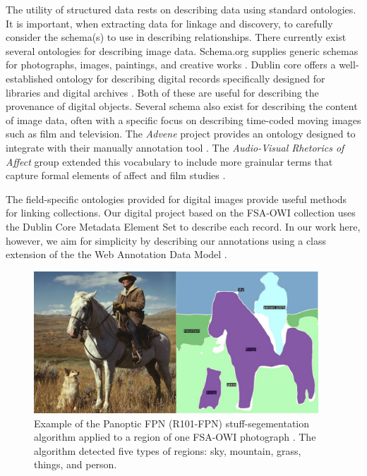 \documentclass[10pt, a4paper]{article}
\begin{document}
The utility of structured data rests on describing data using standard
ontologies. It is important, when extracting data for linkage and discovery,
to carefully consider the schema(s) to use in describing relationships. There
currently exist several ontologies for describing image data. Schema.org
supplies generic schemas for photographs, images, paintings, and creative works
\cite{guha2016schema}. Dublin core offers a well-established ontology for
describing digital records specifically designed for libraries and digital
archives \cite{weibel1997dublin}. Both of these are useful for describing the
provenance of digital objects. Several schema also exist for describing the
content of image data, often with a specific focus on describing time-coded
moving images such as film and television. The \textit{Advene} project provides
an ontology designed to integrate with their manually annotation
tool \cite{aubert2005advene}. The \textit{Audio-Visual Rhetorics of Affect}
group extended this vocabulary to include more grainular terms that capture
formal elements of affect and film studies \cite{agt2018semantic}.

The field-specific ontologies provided for digital images provide useful
methods for linking collections. Our digital project based on the FSA-OWI
collection uses the Dublin Core Metadata Element Set to describe each record.
In our work here, however, we aim for simplicity by describing our annotations
using a class extension of the the Web Annotation Data Model \cite{w3c}.

\begin{figure}[!ht]
\begin{center}
\includegraphics[width=0.95\textwidth]{../figures/segmentation_examples_small.jpg}
\caption{Example of the Panoptic FPN (R101-FPN) stuff-segementation algorithm
applied to a region of one FSA-OWI photograph \protect\cite{wu2019detectron2}.
The algorithm detected five types of regions: sky, mountain, grass, things,
and person.}
\label{tab:segmentation}
\end{center}
\end{figure}
\end{document}
